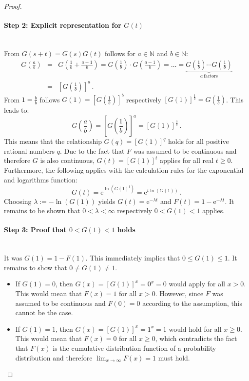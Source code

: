 \documentclass[a4paper,11pt,oneside]{article}
\theoremstyle{definition}
\begin{document}
\begin{proof}
\paragraph{Step 2: Explicit representation for $G(t)$}~\\
From $G(s+t)=G(s)G(t)$ follows for $a\in\mathbb{N}$ and $b\in\mathbb{N}$:
\begin{eqnarray*}
G\left(\frac{a}{b}\right)&=&
G\left(\frac{1}{b}+\frac{a-1}{b}\right)=
G\left(\frac{1}{b}\right)\cdot G\left(\frac{a-1}{b}\right)=
\ldots=
\underbrace{G\left(\frac{1}{b}\right)\cdots G\left(\frac{1}{b}\right)}_{a~\textrm{factors}}\\
~&=&\left[G\left(\frac{1}{b}\right)\right]^a\,.
\end{eqnarray*}
From $1=\frac{b}{b}$ follows $G(1)=\left[G\left(\frac{1}{b}\right)\right]^b$ respectively $\left[G(1)\right]^{\frac{1}{b}}=G\left(\frac{1}{b}\right)$.
This leads to:
$$
G\left(\frac{a}{b}\right)=
\left[G\left(\frac{1}{b}\right)\right]^a=
\left[G(1)\right]^{\frac{a}{b}}\,.
$$
This means that the relationship $G(q)=[G(1)]^q$ holds for all positive rational numbers $q$. Due to the fact that $F$ was assumed to be continuous and therefore $G$ is also continuous, $G(t)=[G(1)]^t$ applies for all real $t\ge0$. Furthermore, the following applies with the calculation rules for the exponential and logarithms function:
$$
G(t)=
\mathrm{e}^{\ln\left(G(1)^t\right)}=
\mathrm{e}^{t\ln(G(1))}\,.
$$
Choosing $\lambda:=-\ln(G(1))$ yields $G(t)=\mathrm{e}^{-\lambda t}$ and $F(t)=1-\mathrm{e}^{-\lambda t}$.
It remains to be shown that $0<\lambda<\infty$ respectively $0<G(1)<1$ applies.

\paragraph{Step 3: Proof that $0<G(1)<1$ holds}~\\
It was $G(1)=1-F(1)$. This immediately implies that $0\le G(1)\le1$. It remains to show that $0\neq G(1)\neq1$.
\begin{itemize}
\item
If $G(1)=0$, then $G(x)=\left[G(1)\right]^x=0^x=0$ would apply for all $x>0$. This would mean that $F(x)=1$ for all $x>0$. However, since $F$ was assumed to be continuous and $F(0)=0$ according to the assumption, this cannot be the case.
\item
If $G(1)=1$, then $G(x)=\left[G(1)\right]^x=1^x=1$ would hold for all $x\ge0$. This would mean that $F(x)=0$ for all $x\ge0$, which contradicts the fact that $F(x)$ is the cumulative distribution function of a probability distribution and therefore $\lim_{x\to\infty}F(x)=1$ must hold.
\end{itemize}
\end{proof}
\end{document}
